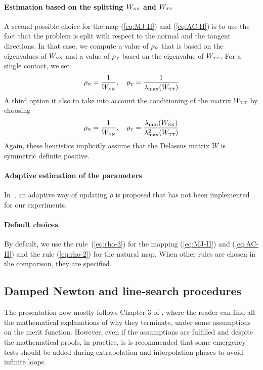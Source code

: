 \paragraph{Estimation based on the splitting  $W_{{\hbox{\tiny{N}}}{\hbox{\tiny{N}}}}$ and $W_{{\hbox{\tiny{T}}}{\hbox{\tiny{T}}}}$} A second possible choice for the map  (\ref{eq:MJ-II}) and (\ref{eq:AC-II}) is to use the fact that the problem is split with respect to the normal and the tangent directions. In that case, we compute a value of $\rho_{\hbox{\tiny{N}}}$ that is based on the eigenvalues of $W_{{\hbox{\tiny{N}}}{\hbox{\tiny{N}}}}$ and a value of $\rho_{\hbox{\tiny{T}}}$ based on the eigenvalue of $W_{{\hbox{\tiny{T}}}{\hbox{\tiny{T}}}}$. For a single contact, we set
\begin{equation}
  \label{eq:rho-3}
  \rho_\n = \frac 1 {W_{\n\n}}, \quad \rho_\t = \frac{1}{\lambda_{\max}(W_{\t\t})}
\end{equation}
A third option it also to take into account the conditioning of the matrix $W_{{\hbox{\tiny{T}}}{\hbox{\tiny{T}}}}$ by choosing
\begin{equation}
  \label{eq:rho-4}
  \rho_\n = \frac 1 {W_{\n\n}}, \quad \rho_\t = \frac{\lambda_{\min}(W_{\n\n})}{\lambda^2_{\max}(W_{\t\t})}
\end{equation}
Again, these heuristics implicitly assume that the Delassus matrix $W$ is symmetric definite positive.
\paragraph{Adaptive estimation of the parameters} In~\cite{Koziara.Bicanic_CMAME2008}, an adaptive way of updating $\rho$ is proposed that has not been implemented for our experiments.

\paragraph{Default choices} By default, we use the rule~(\ref{eq:rho-3}) for the mapping  (\ref{eq:MJ-II}) and (\ref{eq:AC-II}) and the rule  (\ref{eq:rho-2}) for the natural map. When other rules are chosen in the comparison, they are specified.


\subsection{Damped Newton and line-search procedures}

The presentation now mostly follows Chapter 3 of
\cite{Bonnans.ea2003}, where the reader can find all the mathematical
explanations of why they terminate, under some assumptions on the merit
function. However, even if the assumptions are fulfilled and despite the
mathematical proofs, in practice, is is recommended that some emergency tests
should be added during extrapolation and interpolation phases to avoid
infinite loops.

